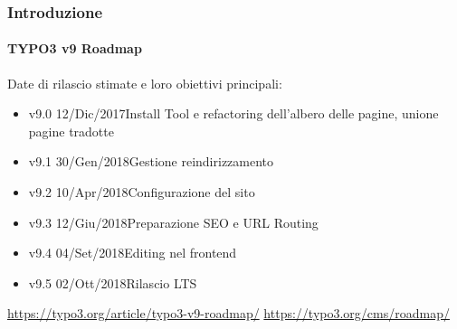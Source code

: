 \begin{frame}[fragile]
	\frametitle{Introduzione}
	\framesubtitle{TYPO3 v9 Roadmap}

	Date di rilascio stimate e loro obiettivi principali:

	\begin{itemize}

		\item v9.0 \tabto{1.1cm}12/Dic/2017\tabto{3.4cm}Install Tool e refactoring dell'albero delle\newline
			\tabto{3.4cm}pagine, unione pagine tradotte
		\item v9.1 \tabto{1.1cm}30/Gen/2018\tabto{3.4cm}Gestione reindirizzamento
		\item v9.2 \tabto{1.1cm}10/Apr/2018\tabto{3.4cm}Configurazione del sito
		\item
			\begingroup
				\color{typo3orange}
					v9.3 \tabto{1.1cm}12/Giu/2018\tabto{3.4cm}Preparazione SEO e URL Routing 
			\endgroup
		\item v9.4 \tabto{1.1cm}04/Set/2018\tabto{3.4cm}Editing nel frontend
		\item v9.5 \tabto{1.1cm}02/Ott/2018\tabto{3.4cm}Rilascio LTS

	\end{itemize}

	\smaller
		\url{https://typo3.org/article/typo3-v9-roadmap/}\newline
		\url{https://typo3.org/cms/roadmap/}
	\normalsize

\end{frame}

